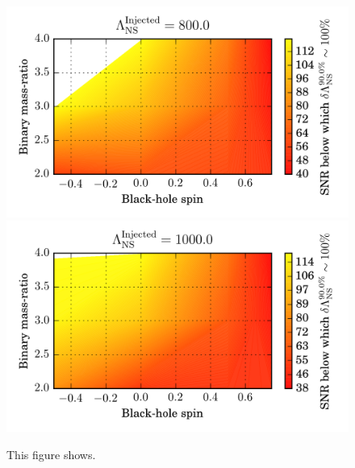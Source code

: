 \documentclass[aps,prd,amsmath,floats,floatfix, twocolumn,
superscriptaddress,nofootinbib,showpacs]{revtex4-1}
\begin{document}
\begin{figure}
\includegraphics[width=.65\columnwidth]{plots-TT/TT_SNRThresholdForLambdaMeasurement_BHspin_MassRatio_Lambda800_0_CI90_0.png}
\includegraphics[width=.65\columnwidth]{plots-TT/TT_SNRThresholdForLambdaMeasurement_BHspin_MassRatio_Lambda1000_0_CI90_0.png}
\caption{This figure shows.}
\label{fig:TT_SNRThresholdForLambdaMeasurement_BHspin_MassRatio_CI90_0}
\end{figure}
% 
\end{document}
